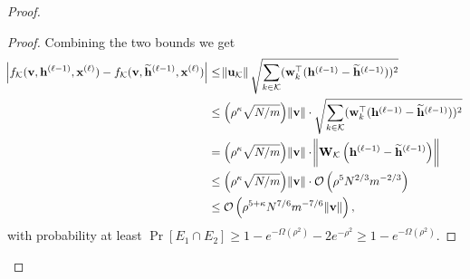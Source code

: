 \begin{proof}
\begin{proof}
		Combining the two bounds we get 
		\begin{align*}
			\abs{f_{\mathcal{K}}(\mathbf{v}, \mathbf{h}^{(\ell-1)}, \mathbf{x}^{(\ell)}) - f_{\mathcal{K}}(\mathbf{v}, \widetilde{\mathbf{h}}^{(\ell-1)}, \mathbf{x}^{(\ell)}) }  &\le \norm{\mathbf{u}_{\mathcal{K}}} \sqrt{\sum_{k \in \mathcal{K}} (\mathbf{w}_k^{\top} (\mathbf{h}^{(\ell-1)} - \widetilde{\mathbf{h}}^{(\ell-1)}))^2}
			\\& \leq \left(\rho^{\kappa} \sqrt{N/m} \right) \norm{\mathbf{v}}  \cdot
			\sqrt{\sum_{k \in \mathcal{K}} (\mathbf{w}_k^{\top} (\mathbf{h}^{(\ell-1)} - \widetilde{\mathbf{h}}^{(\ell-1)}))^2} \\&
			= \left(\rho^{\kappa} \sqrt{N/m} \right) \norm{\mathbf{v}}  \cdot
			\norm{ \mathbf{W}_{\mathcal{K}} \left(\mathbf{h}^{(\ell-1)} - \widetilde{\mathbf{h}}^{(\ell-1)}\right) }
			\\& \leq \left(\rho^{\kappa} \sqrt{N/m} \right) \norm{\mathbf{v}} \cdot  \mathcal{O}\left(\rho^{5} N^{2 / 3} m^{-2 / 3}\right) \\&\le \mathcal{O}\left(\rho^{5 + \kappa} N^{7/6} m^{-7/6} \norm{\mathbf{v}} \right),
		\end{align*}
		with probability at least $\Pr[E_1 \cap E_2] \geq 1 - e^{-\Omega(\rho^2)} - 2e^{-\rho^2} \ge 1 - e^{-\Omega(\rho^2)}$.
	\end{proof}
	

\end{proof}
